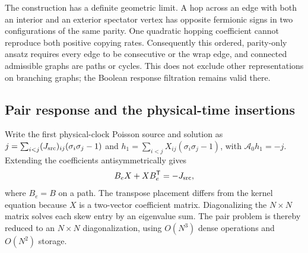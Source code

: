 \documentclass[aps,pre,reprint,amsmath,amssymb,longbibliography]{revtex4-2}
\begin{document}
The construction has a definite geometric limit. A hop across an edge
with both an interior and an exterior spectator vertex has opposite
fermionic signs in two configurations of the same parity. One quadratic
hopping coefficient cannot reproduce both positive copying rates.
Consequently this ordered, parity-only ansatz requires every edge to be
consecutive or the wrap edge, and connected admissible graphs are paths
or cycles. This does not exclude other representations on branching
graphs; the Boolean response filtration remains valid there.

\subsection{Pair response and the physical-time insertions}
\label{app:v3-sylvester-time}

Write the first physical-clock Poisson source and solution as
$j=\sum_{i<j}(J_{\rm src})_{ij}(\sigma_i\sigma_j-1)$ and
$h_1=\sum_{i<j}X_{ij}(\sigma_i\sigma_j-1)$, with
$\mathcal A_0h_1=-j$. Extending the coefficients antisymmetrically gives
\begin{equation}
 B_eX+XB_e^{\mathsf T}=-J_{\rm src},
 \label{eq:v3-pair-sylvester}
\end{equation}
where $B_e=B$ on a path. The transpose placement differs from the
kernel equation because $X$ is a two-vector coefficient matrix.
Diagonalizing the $N\times N$ matrix solves each skew entry by an
eigenvalue sum. The pair problem is thereby reduced to an $N\times N$
diagonalization, using $O(N^3)$ dense operations and $O(N^2)$ storage.
\end{document}

